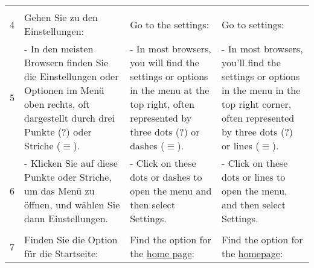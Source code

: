 {\begin{tabularx}{\textwidth}{l>{\raggedright\arraybackslash}X>{\raggedright\arraybackslash}X>{\raggedright\arraybackslash}X}
   &                                                                                                                                                   &                                                                                                                                            &                                                                                                                                                \\
4  & Gehen Sie zu den Einstellungen:                                                                                                                   & Go to the settings:                                                                                                                        & Go to settings:                                                                                                                                \\
5  & - In den meisten Browsern finden Sie die Einstellungen oder Optionen im Menü oben rechts, oft dargestellt durch drei Punkte (?) oder Striche ($\equiv$). & - In most browsers, you will find the settings or options in the menu at the top right, often represented by three dots (?) or dashes ($\equiv$). & - In most browsers, you'll find the settings or options in the menu in the top right corner, often represented by three dots (?) or lines ($\equiv$). \\
6  & - Klicken Sie auf diese Punkte oder Striche, um das Menü zu öffnen, und wählen Sie dann Einstellungen.                                            & - Click on these dots or dashes to open the menu and then select Settings.                                                                 & - Click on these dots or lines to open the menu, and then select Settings.                                                                     \\
   &                                                                                                                                                   &                                                                                                                                            &                                                                                                                                                \\
7  & Finden Sie die Option für die Startseite:                                                                                                         & Find the option for the \underline{home page}:                                                                                                         & Find the option for the \underline{homepage}:                                                                                                              \\

\end{tabularx}}
